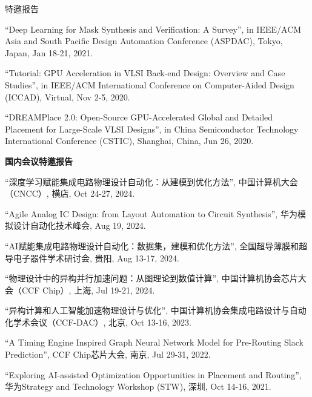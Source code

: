\begin{rSection}{特邀报告}
\begin{description}[font=\normalfont]
\item[{[T3]}]{
``Deep Learning for Mask Synthesis and Verification: A Survey'', in IEEE/ACM Asia and South Pacific Design Automation Conference (ASPDAC), Tokyo, Japan, Jan 18-21, 2021.
}

\item[{[T2]}]{
``Tutorial: GPU Acceleration in VLSI Back-end Design: Overview and Case Studies'', in IEEE/ACM International Conference on Computer-Aided Design (ICCAD), Virtual, Nov 2-5, 2020. 
}

\item[{[T1]}]{
``DREAMPlace 2.0: Open-Source GPU-Accelerated Global and Detailed Placement for Large-Scale VLSI Designs'', in China Semiconductor Technology International Conference (CSTIC), Shanghai, China, Jun 26, 2020. 
}

\end{description}

\textbf{国内会议特邀报告}
        
\begin{description}[font=\normalfont]

\item[{[T12]}]{
``深度学习赋能集成电路物理设计自动化：从建模到优化方法'', 中国计算机大会（CNCC）, 横店, Oct 24-27, 2024. 
}

\item[{[T11]}]{
``Agile Analog IC Design: from Layout Automation to Circuit Synthesis'', 华为模拟设计自动化技术峰会, Aug 19, 2024. 
}

\item[{[T10]}]{
``AI赋能集成电路物理设计自动化：数据集，建模和优化方法'', 全国超导薄膜和超导电子器件学术研讨会, 贵阳, Aug 13-17, 2024. 
}

\item[{[T9]}]{
``物理设计中的异构并行加速问题：从图理论到数值计算'', 中国计算机协会芯片大会（CCF Chip）, 上海, Jul 19-21, 2024. 
}

\item[{[T8]}]{
``异构计算和人工智能加速物理设计与优化'', 中国计算机协会集成电路设计与自动化学术会议（CCF-DAC）, 北京, Oct 13-16, 2023. 
}

\item[{[T7]}]{
``A Timing Engine Inspired Graph Neural Network Model for Pre-Routing Slack Prediction'', CCF Chip芯片大会, 南京, Jul 29-31, 2022. 
}

\item[{[T6]}]{
``Exploring AI-assisted Optimization Opportunities in Placement and Routing'', 华为Strategy and Technology Workshop (STW), 深圳, Oct 14-16, 2021. 
}


\end{description}
\end{rSection}
